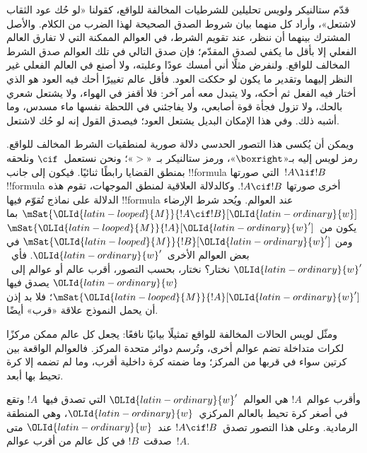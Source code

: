 \documentclass[../../../include/open-logic-section]{subfiles}
\begin{document}


قدّم ستالنيكر ولويس تحليلين للشرطيات المخالفة للواقع، كقولنا «لو حُك
عود الثقاب لاشتعل»، وأراد كل منهما بيان شروط الصدق الصحيحة لهذا الضرب
من الكلام. والأصل المشترك بينهما أن ننظر، عند تقويم الشرط، في العوالم
الممكنة التي لا تفارق العالم الفعلي إلا بأقل ما يكفي لصدق المقدّم؛ فإن
صدق التالي في تلك العوالم صدق الشرط المخالف للواقع. ولنفرض مثلًا أني
أمسك عودًا وعلبته، ولا أصنع في العالم الفعلي غير النظر إليهما وتقدير ما
يكون لو حككت العود. فأقل عالم تغييرًا أحك فيه العود هو الذي أختار فيه
الفعل ثم أحكه، ولا يتبدل معه أمر آخر: فلا أقفز في الهواء، ولا يشتعل
شعري بالحك، ولا تزول فجأة قوة أصابعي، ولا يفاجئني في اللحظة نفسها ماء
مسدس، وما أشبه ذلك. وفي هذا الإمكان البديل يشتعل العود؛ فيصدق القول إنه
لو حُك لاشتعل.

ويمكن أن يُكسى هذا التصور الحدسي دلالة صورية لمنطقيات الشرط المخالف
للواقع. رمز لويس إليه بـ«$\boxright$»، ورمز ستالنيكر بـ~«$>$»؛ ونحن
نستعمل~$\cif$ ونلحقه بمنطق القضايا رابطًا ثنائيًا. فيكون إلى جانب
!!{formula} التي صورتها~$!A \lif !B$ !!{formula} أخرى صورتها
$!A \cif !B$. وكالدلالة العلاقية لمنطق الموجهات، تقوم هذه الدلالة على
نماذج تُقوّم فيها !!{formula} عند العوالم. ويُحد شرط الإرضاء
$\mSat{{\OLId{latin-looped}{M}}}{!A \cif !B}[{\OLId{latin-ordinary}{w}}]$ بما يكون من~$\mSat{{\OLId{latin-looped}{M}}}{!A}[{\OLId{latin-ordinary}{w}}']$ ومن
$\mSat{{\OLId{latin-looped}{M}}}{!B}[{\OLId{latin-ordinary}{w}}']$ في بعض العوالم الأخرى~${\OLId{latin-ordinary}{w}}'$. فأي~${\OLId{latin-ordinary}{w}}'$ نختار؟ نختار،
بحسب التصور، أقرب عالم أو عوالم إلى~${\OLId{latin-ordinary}{w}}$ يصدق فيها
$\mSat{{\OLId{latin-looped}{M}}}{!A}[{\OLId{latin-ordinary}{w}}']$؛ فلا بد إذن أن يحمل النموذج علاقة «قرب» أيضًا.

ومثّل لويس الحالات المخالفة للواقع تمثيلًا بيانيًا نافعًا: يجعل كل عالم
ممكن مركزًا لكرات متداخلة تضم عوالم أخرى، وتُرسم دوائر متحدة المركز.
فالعوالم الواقعة بين كرتين سواء في قربها من المركز؛ وما ضمته كرة داخلية
أقرب، وما لم تضمه إلا كرة تحيط بها أبعد.
\begin{center}
\end{center}
وأقرب عوالم~$!A$ هي العوالم~${\OLId{latin-ordinary}{w}}'$ التي تصدق فيها~$!A$ وتقع في أصغر
كرة تحيط بالعالم المركزي~${\OLId{latin-ordinary}{w}}$، وهي المنطقة الرمادية. وعلى هذا التصور
تصدق~$!A \cif !B$ عند~${\OLId{latin-ordinary}{w}}$ متى صدقت~$!B$ في كل عالم من أقرب
عوالم~$!A$.
\end{document}
